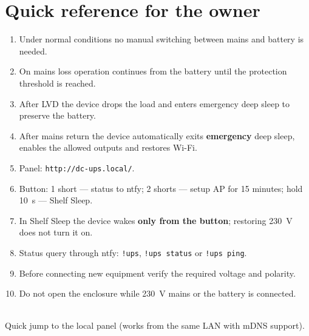 \documentclass[11pt,a4paper]{article}
\begin{document}
\section{Quick reference for the owner}
\begin{enumerate}[leftmargin=8mm]
  \item Under normal conditions no manual switching between mains and battery is needed.
  \item On mains loss operation continues from the battery until the protection threshold is reached.
  \item After LVD the device drops the load and enters emergency deep sleep to preserve the battery.
  \item After mains return the device automatically exits \textbf{emergency} deep sleep, enables the allowed outputs and restores Wi-Fi.
  \item Panel: \texttt{http://dc-ups.local/}.
  \item Button: 1 short --- status to ntfy; 2 shorts --- setup AP for 15 minutes; hold 10~s --- Shelf Sleep.
  \item In Shelf Sleep the device wakes \textbf{only from the button}; restoring 230~V does not turn it on.
  \item Status query through ntfy: \texttt{!ups}, \texttt{!ups status} or \texttt{!ups ping}.
  \item Before connecting new equipment verify the required voltage and polarity.
  \item Do not open the enclosure while 230~V mains or the battery is connected.
\end{enumerate}

\begin{center}
\vfill
{}\\[2mm]
{\small Quick jump to the local panel (works from the same LAN with mDNS support).}
\end{center}
\end{document}
